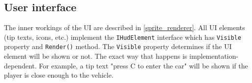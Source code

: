 \subsection{User interface}
The inner workings of the UI are described in \ref{sprite_renderer}.
All UI elements (tip texts, icons, etc.) implement the \texttt{IHudElement} interface which has \texttt{Visible} property and \texttt{Render()} method.
The \texttt{Visible} property determines if the UI element will be shown or not.
The exact way that happens is implementation-dependent.
For example, a tip text "press C to enter the car" will be shown if the player is close enough to the vehicle.